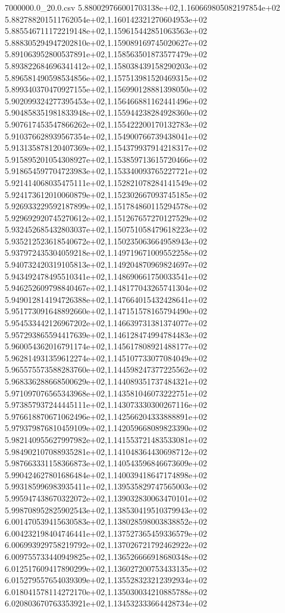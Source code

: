 \begin{filecontents*}{7000000.0_20.0.csv}
5.880029766001703138e+02,1.160669805082197854e+02
5.882788201511762054e+02,1.160142321270604953e+02
5.885546711172219148e+02,1.159615442851063563e+02
5.888305294947202810e+02,1.159089169745020627e+02
5.891063952800537891e+02,1.158563501873577479e+02
5.893822684696341412e+02,1.158038439158290203e+02
5.896581490598534856e+02,1.157513981520469315e+02
5.899340370470927155e+02,1.156990128881398050e+02
5.902099324277395453e+02,1.156466881162441496e+02
5.904858351981833948e+02,1.155944238284928360e+02
5.907617453547866262e+02,1.155422200170132783e+02
5.910376628939567354e+02,1.154900766739438041e+02
5.913135878120407369e+02,1.154379937914218317e+02
5.915895201054308927e+02,1.153859713615720466e+02
5.918654597704723983e+02,1.153340093765227721e+02
5.921414068035475111e+02,1.152821078284141549e+02
5.924173612010060879e+02,1.152302667093745185e+02
5.926933229592187899e+02,1.151784860115294578e+02
5.929692920745270612e+02,1.151267657270127529e+02
5.932452685432803037e+02,1.150751058479618223e+02
5.935212523618540672e+02,1.150235063664958943e+02
5.937972435304059218e+02,1.149719671009552258e+02
5.940732420319105813e+02,1.149204870969824697e+02
5.943492478495510341e+02,1.148690661750033541e+02
5.946252609798840467e+02,1.148177043265741304e+02
5.949012814194726388e+02,1.147664015432428641e+02
5.951773091648892660e+02,1.147151578165794490e+02
5.954533442126967202e+02,1.146639731381374077e+02
5.957293865594417639e+02,1.146128474994784483e+02
5.960054362016791174e+02,1.145617808921488177e+02
5.962814931359612274e+02,1.145107733077084049e+02
5.965575573588283760e+02,1.144598247377225562e+02
5.968336288668500629e+02,1.144089351737484321e+02
5.971097076565343968e+02,1.143581046073222751e+02
5.973857937244445111e+02,1.143073330300267116e+02
5.976618870671062496e+02,1.142566204333888891e+02
5.979379876810459109e+02,1.142059668089823390e+02
5.982140955627997982e+02,1.141553721483533081e+02
5.984902107088935281e+02,1.141048364430698712e+02
5.987663331158366873e+02,1.140543596846673609e+02
5.990424627801686484e+02,1.140039418647174898e+02
5.993185996983935411e+02,1.139535829747565003e+02
5.995947438670322072e+02,1.139032830063470101e+02
5.998708952825902543e+02,1.138530419510379943e+02
6.001470539415630583e+02,1.138028598003838852e+02
6.004232198404746441e+02,1.137527365459336579e+02
6.006993929758219792e+02,1.137026721792462922e+02
6.009755733440949825e+02,1.136526666918680348e+02
6.012517609417890299e+02,1.136027200753433135e+02
6.015279557654039309e+02,1.135528323212392934e+02
6.018041578114272170e+02,1.135030034210885788e+02
6.020803670763353921e+02,1.134532333664428734e+02

\end{filecontents*}
